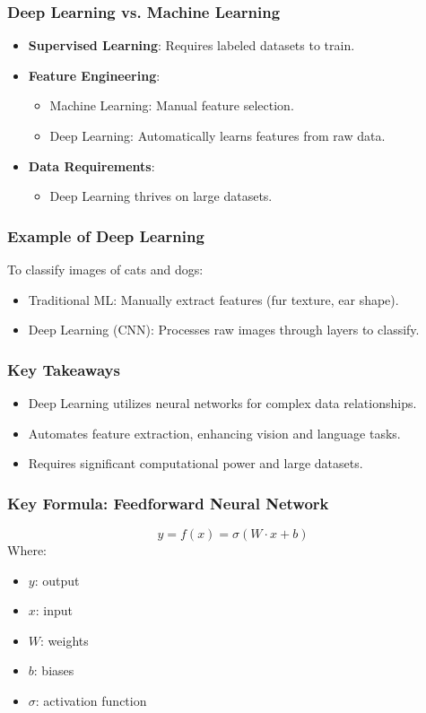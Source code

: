 \documentclass{beamer}
\begin{document}
\begin{frame}[fragile]
    \frametitle{Deep Learning vs. Machine Learning}
    \begin{itemize}
        \item \textbf{Supervised Learning}: Requires labeled datasets to train.
        \item \textbf{Feature Engineering}: 
            \begin{itemize}
                \item Machine Learning: Manual feature selection.
                \item Deep Learning: Automatically learns features from raw data.
            \end{itemize}
        \item \textbf{Data Requirements}: 
            \begin{itemize}
                \item Deep Learning thrives on large datasets.
            \end{itemize}
    \end{itemize}
\end{frame}

\begin{frame}[fragile]
    \frametitle{Example of Deep Learning}
    To classify images of cats and dogs:
    \begin{itemize}
        \item Traditional ML: Manually extract features (fur texture, ear shape).
        \item Deep Learning (CNN): Processes raw images through layers to classify.
    \end{itemize}
\end{frame}

\begin{frame}[fragile]
    \frametitle{Key Takeaways}
    \begin{itemize}
        \item Deep Learning utilizes neural networks for complex data relationships.
        \item Automates feature extraction, enhancing vision and language tasks.
        \item Requires significant computational power and large datasets.
    \end{itemize}
\end{frame}

\begin{frame}[fragile]
    \frametitle{Key Formula: Feedforward Neural Network}
    \begin{equation}
        y = f(x) = \sigma(W \cdot x + b)
    \end{equation}
    Where:
    \begin{itemize}
        \item $y$: output
        \item $x$: input
        \item $W$: weights
        \item $b$: biases
        \item $\sigma$: activation function
    \end{itemize}
\end{frame}
\end{document}
